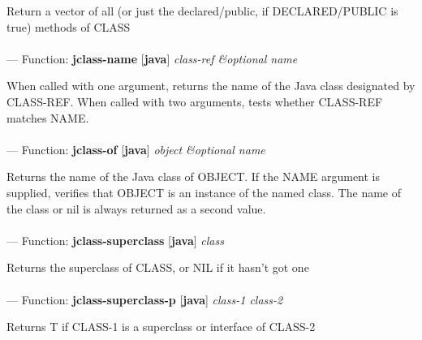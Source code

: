 \begin{adjustwidth}{5em}{5em}
Return a vector of all (or just the declared/public, if DECLARED/PUBLIC is true) methods of CLASS
\end{adjustwidth}

\paragraph{}
\label{JAVA:JCLASS-NAME}
--- Function: \textbf{jclass-name} [\textbf{java}] \textit{class-ref \&optional name}

\begin{adjustwidth}{5em}{5em}
When called with one argument, returns the name of the Java class
  designated by CLASS-REF. When called with two arguments, tests
  whether CLASS-REF matches NAME.
\end{adjustwidth}

\paragraph{}
\label{JAVA:JCLASS-OF}
--- Function: \textbf{jclass-of} [\textbf{java}] \textit{object \&optional name}

\begin{adjustwidth}{5em}{5em}
Returns the name of the Java class of OBJECT. If the NAME argument is
  supplied, verifies that OBJECT is an instance of the named class. The name
  of the class or nil is always returned as a second value.
\end{adjustwidth}

\paragraph{}
\label{JAVA:JCLASS-SUPERCLASS}
--- Function: \textbf{jclass-superclass} [\textbf{java}] \textit{class}

\begin{adjustwidth}{5em}{5em}
Returns the superclass of CLASS, or NIL if it hasn't got one
\end{adjustwidth}

\paragraph{}
\label{JAVA:JCLASS-SUPERCLASS-P}
--- Function: \textbf{jclass-superclass-p} [\textbf{java}] \textit{class-1 class-2}

\begin{adjustwidth}{5em}{5em}
Returns T if CLASS-1 is a superclass or interface of CLASS-2
\end{adjustwidth}

